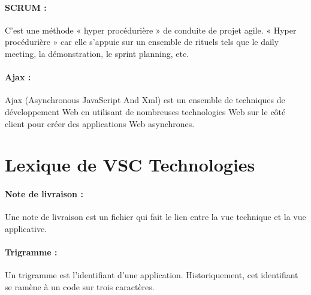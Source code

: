 \paragraph{SCRUM : }
\label{lexi:scrum}
C’est une méthode « hyper procédurière » de conduite de projet agile.
« Hyper procédurière » car elle s’appuie sur un ensemble de rituels tels que le daily meeting, la démonstration, le sprint planning, etc.

\paragraph{Ajax : }
\label{lexi:ajax}
Ajax (Asynchronous JavaScript And Xml) est un ensemble de techniques de développement Web en utilisant de nombreuses technologies Web sur le côté client pour créer des applications Web asynchrones.

\section{Lexique de VSC Technologies}

\paragraph{Note de livraison : }
\label{lexi:delivery_note}
Une note de livraison est un fichier qui fait le lien entre la vue technique et la vue applicative.

\paragraph{Trigramme : }
\label{lexi:trigramme}
Un trigramme est l'identifiant d'une application.
Historiquement, cet identifiant se ramène à un code sur trois caractères.
